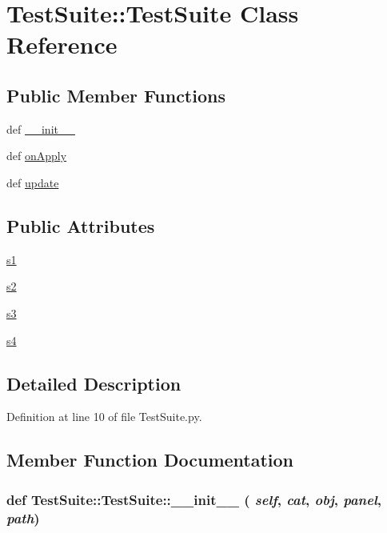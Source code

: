 \hypertarget{classTestSuite_1_1TestSuite}{
\section{TestSuite::TestSuite Class Reference}
\label{classTestSuite_1_1TestSuite}
}
\subsection*{Public Member Functions}
\begin{DoxyCompactItemize}
\item 
def \hyperlink{classTestSuite_1_1TestSuite_a064abccc146fe414e554e4fc3246410a}{\_\-\_\-init\_\-\_\-}
\item 
def \hyperlink{classTestSuite_1_1TestSuite_a80b48e10e265f0bee62ae672364621a6}{onApply}
\item 
def \hyperlink{classTestSuite_1_1TestSuite_ac971f21027b51f6266bf1ffe875781d2}{update}
\end{DoxyCompactItemize}
\subsection*{Public Attributes}
\begin{DoxyCompactItemize}
\item 
\hyperlink{classTestSuite_1_1TestSuite_aab040614aa1856540c3350159aa2d400}{s1}
\item 
\hyperlink{classTestSuite_1_1TestSuite_afb317b632353bd3ed504627458247062}{s2}
\item 
\hyperlink{classTestSuite_1_1TestSuite_a90deb1b548daa550141b71dfeacae780}{s3}
\item 
\hyperlink{classTestSuite_1_1TestSuite_aa5d3fc0a9e3afb7491c124e4374da5ed}{s4}
\end{DoxyCompactItemize}


\subsection{Detailed Description}


Definition at line 10 of file TestSuite.py.

\subsection{Member Function Documentation}
\hypertarget{classTestSuite_1_1TestSuite_a064abccc146fe414e554e4fc3246410a}{
\subsubsection[{\_\-\_\-init\_\-\_\-}]{\setlength{\rightskip}{0pt plus 5cm}def TestSuite::TestSuite::\_\-\_\-init\_\-\_\- ( {\em self}, \/   {\em cat}, \/   {\em obj}, \/   {\em panel}, \/   {\em path})}}
\label{classTestSuite_1_1TestSuite_a064abccc146fe414e554e4fc3246410a}


